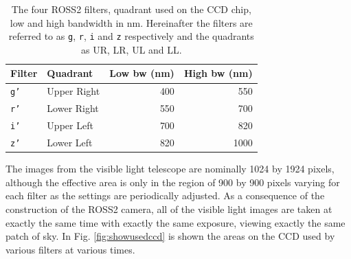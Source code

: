 \begin{table}[!htbp]
\begin{center}
\begin{tabular}{llrr} \hline
Filter & Quadrant & Low bw (nm) & High bw (nm) \\\hline
\texttt{g'} & Upper Right & 400 & 550 \\
\texttt{r'} & Lower Right & 550 & 700 \\
\texttt{i'} & Upper Left & 700 & 820 \\
\texttt{z'} & Lower Left & 820 & 1000 \\
\hline
\end{tabular}
\end{center}
\caption{The four ROSS2 filters, quadrant used on the CCD chip, low and high
bandwidth in nm. Hereinafter the filters are referred to as \texttt{g},
\texttt{r}, \texttt{i} and \texttt{z} respectively and the quadrants as UR, LR,
UL and LL.} \protect\label{table:ros2quad}
\end{table}

The images from the visible light telescope are nominally 1024 by 1924 pixels,
although the effective area is only in the region of 900 by 900
pixels varying for each filter as the settings are periodically adjusted.
As a consequence of the construction of the ROSS2 camera, all of the visible
light images are taken at exactly the same time with exactly the same
exposure, viewing exactly the same patch of sky. In Fig. \ref{fig:showusedccd}
is shown the areas on the CCD used by various filters at various times.

